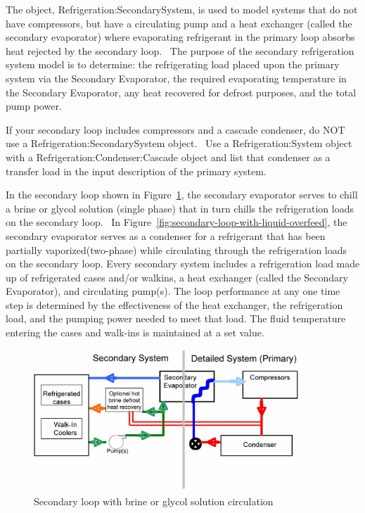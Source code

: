 The object, Refrigeration:SecondarySystem, is used to model systems that do not have compressors, but have a circulating pump and a heat exchanger (called the secondary evaporator) where evaporating refrigerant in the primary loop absorbs heat rejected by the secondary loop.~ The purpose of the secondary refrigeration system model is to determine: the refrigerating load placed upon the primary system via the Secondary Evaporator, the required evaporating temperature in the Secondary Evaporator, any heat recovered for defrost purposes, and the total pump power.

If your secondary loop includes compressors and a cascade condenser, do NOT use a Refrigeration:SecondarySystem object.~ Use a Refrigeration:System object with a Refrigeration:Condenser:Cascade object and list that condenser as a transfer load in the input description of the primary system.

In the secondary loop shown in Figure~\ref{fig:secondary-loop-with-brine-or-glycol-solution}, the secondary evaporator serves to chill a brine or glycol solution (single phase) that in turn chills the refrigeration loads on the secondary loop.~ In Figure~\ref{fig:secondary-loop-with-liquid-overfeed}, the secondary evaporator serves as a condenser for a refrigerant that has been partially vaporized(two-phase) while circulating through the refrigeration loads on the secondary loop. Every secondary system includes a refrigeration load made up of refrigerated cases and/or walkins, a heat exchanger (called the Secondary Evaporator), and circulating pump(s). The loop performance at any one time step is determined by the effectiveness of the heat exchanger, the refrigeration load, and the pumping power needed to meet that load. The fluid temperature entering the cases and walk-ins is maintained at a set value.

\begin{figure}[hbtp] %
\centering
\includegraphics[width=0.9\textwidth, height=0.9\textheight, keepaspectratio=true]{media/image6323.png}
\caption{Secondary loop with brine or glycol solution circulation \protect \label{fig:secondary-loop-with-brine-or-glycol-solution}}
\end{figure}

